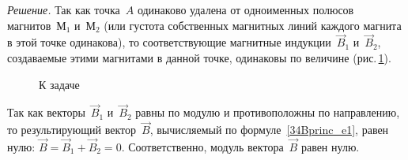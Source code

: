 \documentclass[main.tex]{subfiles}
\begin{document}
\noindent\emph{Решение.} Так как точка~$A$ одинаково удалена от одноименных полюсов магнитов~$\text{М}_1$ и~$\text{М}_2$ (или густота собственных магнитных линий каждого магнита в этой точке одинакова), то соответствующие магнитные индукции~$\vec B_1$ и~$\vec B_2$, создаваемые этими магнитами в данной точке, одинаковы по величине (рис.\,\ref{fig:p144}).

    \begin{figure}[H]
    \centering

\caption{К задаче}
\label{fig:p144}
\end{figure}

Так как векторы~$\vec B_1$ и~$\vec B_2$ равны по модулю и противоположны по направлению, то результирующий вектор~$\vec B$, вычисляемый по формуле~\eqref{34Bprinc_e1}, равен нулю: $\vec B=\vec B_1+\vec B_2=0$. Соответственно, модуль вектора~$\vec B$ равен нулю.  














 
\end{document}

